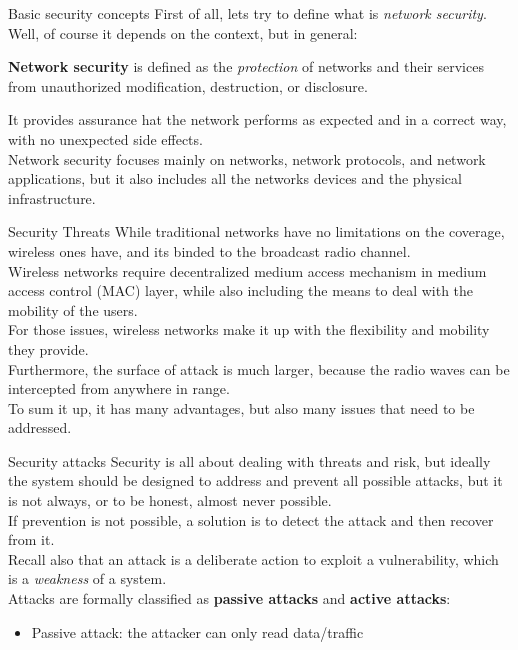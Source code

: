 \begin{section}{Basic security concepts}
  First of all, lets try to define what is \textit{network security}. Well, of course it depends 
  on the context, but in general:
  \begin{boxH}
    \textbf{Network security} is defined as the \textit{protection} of networks and their services from unauthorized
    modification, destruction, or disclosure.
  \end{boxH}
  It provides assurance hat the network performs as expected and in a correct way, with no unexpected 
  side effects.\\
  Network security focuses mainly on networks, network protocols, and network applications, but it 
  also includes all the networks devices and the physical infrastructure.
  \begin{subsection}{Security Threats}
    While traditional networks have no limitations on the coverage, wireless ones have, and its binded
    to the broadcast radio channel.\\
    Wireless networks require decentralized medium access mechanism in medium access
    control (MAC) layer, while also including the means to deal with the mobility of the users.\\
    For those issues, wireless networks make it up with the flexibility and mobility they provide.\\
    Furthermore, the surface of attack is much larger, because the radio waves can be intercepted
    from anywhere in range.\\
    To sum it up, it has many advantages, but also many issues that need to be addressed.
  \end{subsection}
  \begin{subsection}{Security attacks}
    Security is all about dealing with threats and risk, but ideally the system should be designed 
    to address and prevent all possible attacks, but it is not always, or to be honest, almost never possible.\\
    If prevention is not possible, a solution is to detect the attack and then recover from it.\\
    Recall also that an attack is a deliberate action to exploit a vulnerability, which is a 
    \textit{weakness} of a system.\\
    Attacks are formally classified as \textbf{passive attacks} and \textbf{active attacks}:
    \begin{itemize}
      \item Passive attack: the attacker can only read data/traffic

\end{itemize}
\end{subsection}
\end{section}

